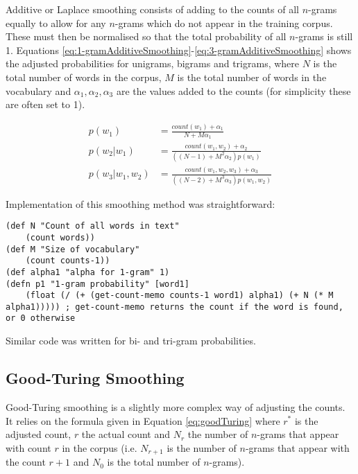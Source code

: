 Additive or Laplace smoothing consists of adding to the counts of all $n$-grams equally to allow for any $n$-grams which do not appear in the training corpus. These must then be normalised so that the total probability of all $n$-grams is still 1. Equations \ref{eq:1-gramAdditiveSmoothing}-\ref{eq:3-gramAdditiveSmoothing} shows the adjusted probabilities for unigrams, bigrams and trigrams, where $N$ is the total number of words in the corpus, $M$ is the total number of words in the vocabulary and $\alpha_{1}, \alpha_{2}, \alpha_{3}$ are the values added to the counts (for simplicity these are often set to 1).

\begin{subequations}
\begin{align}
p(w_{1})&=\frac{count(w_{1})+\alpha_{1}}{N+M\alpha_{1}} \label{eq:1-gramAdditiveSmoothing}
\\
p(w_{2}| w_{1})&=\frac{count(w_{1}, w_{2})+\alpha_{2}}{((N-1)+M^{2}\alpha_{2})p(w_{1})} \label{eq:2-gramAdditiveSmoothing}
\\
p(w_{3}| w_{1}, w_{2}) &= \frac{count(w_{1}, w_{2}, w_{3})+\alpha_{3}}{((N-2)+M^{3}\alpha_{3})p(w_{1}, w_{2})} \label{eq:3-gramAdditiveSmoothing}
\end{align}
\end{subequations}

Implementation of this smoothing method was straightforward:

\begin{lstlisting}
(def N "Count of all words in text" 
	(count words))
(def M "Size of vocabulary" 
	(count counts-1))
(def alpha1 "alpha for 1-gram" 1)
(defn p1 "1-gram probability" [word1] 
	(float (/ (+ (get-count-memo counts-1 word1) alpha1) (+ N (* M alpha1))))) ; get-count-memo returns the count if the word is found, or 0 otherwise
\end{lstlisting}

\noindent Similar code was written for bi- and tri-gram probabilities.

\subsection{Good-Turing Smoothing}

Good-Turing smoothing is a slightly more complex way of adjusting the counts. It relies on the formula given in Equation \ref{eq:goodTuring} where $r^{*}$ is the adjusted count, $r$ the actual count and $N_{r}$ the number of $n$-grams that appear with count $r$ in the corpus (i.e. $N_{r+1}$ is the number of $n$-grams that appear with the count $r+1$ and $N_{0}$ is the total number of $n$-grams).

